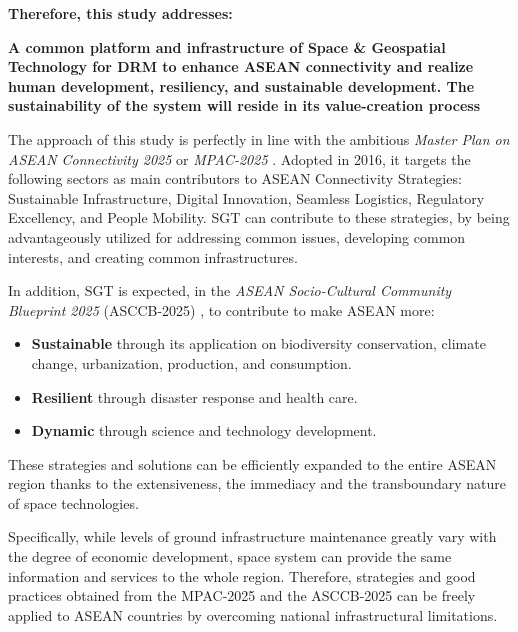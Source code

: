 {\flushleft \bfseries Therefore, this study addresses:\par}
\vspace{0.2 cm}
{\bfseries A common platform and infrastructure of Space \& Geospatial Technology for DRM to enhance ASEAN connectivity and realize human development, resiliency, and sustainable development. The sustainability of the system will reside in its value-creation process\par}

\vspace{0.4 cm}

The approach of this study is perfectly in line with the ambitious \textit{Master Plan on ASEAN Connectivity 2025} or \textit{MPAC-2025} \cite{mpac}. Adopted in 2016, it targets the following sectors as main contributors to ASEAN Connectivity Strategies: Sustainable Infrastructure, Digital Innovation, Seamless Logistics, Regulatory Excellency, and People Mobility. SGT can contribute to these strategies, by being advantageously utilized for addressing common issues, developing common interests, and creating common infrastructures.

\vspace{0.4 cm}

In addition, SGT is expected, in the \textit{ASEAN Socio-Cultural Community Blueprint 2025} (ASCCB-2025) \cite{asccb}, to contribute to make ASEAN more:

\begin{itemize}
\item \textbf{Sustainable} through its application on biodiversity conservation, climate change, urbanization, production, and consumption.
\item \textbf{Resilient} through disaster response and health care. 
\item \textbf{Dynamic} through science and technology development.
\end{itemize}

These strategies and solutions can be efficiently expanded to the entire ASEAN region thanks to the extensiveness, the immediacy and the transboundary nature of space technologies.

\vspace{0.4 cm}

Specifically, while levels of ground infrastructure maintenance greatly vary with the degree of economic development, space system can provide the same information and services to the whole region. Therefore, strategies and good practices obtained from the MPAC-2025 and the ASCCB-2025 can be freely applied to ASEAN countries by overcoming national infrastructural limitations.


